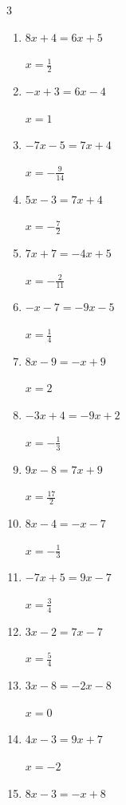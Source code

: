 \begin{multicols}{3}
\begin{enumerate}
  \item $8x+4=6x+5$

        $\displaystyle x=\frac{1}{2}$

  \item $-x+3=6x-4$

        $\displaystyle x=1$

  \item $-7x-5=7x+4$

        $\displaystyle x=-\frac{9}{14}$

  \item $5x-3=7x+4$

        $\displaystyle x=-\frac{7}{2}$

  \item $7x+7=-4x+5$

        $\displaystyle x=-\frac{2}{11}$

  \item $-x-7=-9x-5$

        $\displaystyle x=\frac{1}{4}$

  \item $8x-9=-x+9$

        $\displaystyle x=2$

  \item $-3x+4=-9x+2$

        $\displaystyle x=-\frac{1}{3}$

  \item $9x-8=7x+9$

        $\displaystyle x=\frac{17}{2}$

\columnbreak %

  \item $8x-4=-x-7$

        $\displaystyle x=-\frac{1}{3}$

  \item $-7x+5=9x-7$

        $\displaystyle x=\frac{3}{4}$

  \item $3x-2=7x-7$

        $\displaystyle x=\frac{5}{4}$

  \item $3x-8=-2x-8$

        $\displaystyle x=0$

  \item $4x-3=9x+7$

        $\displaystyle x=-2$

  \item $8x-3=-x+8$


\end{enumerate}
\end{multicols}
